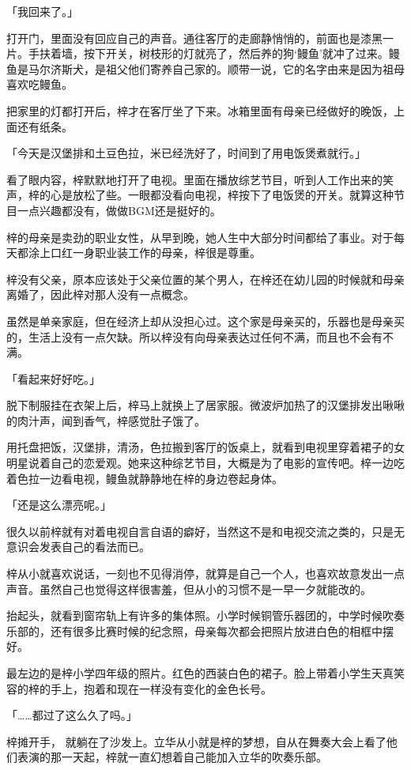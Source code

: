 \documentclass[UTF8]{ctexart}
\begin{document}
    「我回来了。」

    打开门，里面没有回应自己的声音。通往客厅的走廊静悄悄的，前面也是漆黑一片。手扶着墙，按下开关，树枝形的灯就亮了，然后养的狗‘鳗鱼’就冲了过来。鳗鱼是马尔济斯犬，是祖父他们寄养自己家的。顺带一说，它的名字由来是因为祖母喜欢吃鳗鱼。

    把家里的灯都打开后，梓才在客厅坐了下来。冰箱里面有母亲已经做好的晚饭，上面还有纸条。

    「今天是汉堡排和土豆色拉，米已经洗好了，时间到了用电饭煲煮就行。」

    看了眼内容，梓默默地打开了电视。里面在播放综艺节目，听到人工作出来的笑声，梓的心是放松了些。一眼都没看向电视，梓按下了电饭煲的开关。就算这种节目一点兴趣都没有，做做BGM还是挺好的。

    梓的母亲是卖劲的职业女性，从早到晚，她人生中大部分时间都给了事业。对于每天都涂上口红一身职业装工作的母亲，梓很是尊重。

    梓没有父亲，原本应该处于父亲位置的某个男人，在梓还在幼儿园的时候就和母亲离婚了，因此梓对那人没有一点概念。

    虽然是单亲家庭，但在经济上却从没担心过。这个家是母亲买的，乐器也是母亲买的，生活上没有一点欠缺。所以梓没有向母亲表达过任何不满，而且也不会有不满。

    「看起来好好吃。」

    脱下制服挂在衣架上后，梓马上就换上了居家服。微波炉加热了的汉堡排发出啾啾的肉汁声，闻到香气，梓感觉肚子饿了。

    用托盘把饭，汉堡排，清汤，色拉搬到客厅的饭桌上，就看到电视里穿着裙子的女明星说着自己的恋爱观。她来这种综艺节目，大概是为了电影的宣传吧。梓一边吃着色拉一边看电视，鳗鱼就静静地在梓的身边卷起身体。

    「还是这么漂亮呢。」

    很久以前梓就有对着电视自言自语的癖好，当然这不是和电视交流之类的，只是无意识会发表自己的看法而已。

    梓从小就喜欢说话，一刻也不见得消停，就算是自己一个人，也喜欢故意发出一点声音。虽然自己也觉得这样很害羞，但从小的习惯不是一早一夕就能改的。

    抬起头，就看到窗帘轨上有许多的集体照。小学时候铜管乐器团的，中学时候吹奏乐部的，还有很多比赛时候的纪念照，母亲每次都会把照片放进白色的相框中摆好。

    最左边的是梓小学四年级的照片。红色的西装白色的裙子。脸上带着小学生天真笑容的梓的手上，抱着和现在一样没有变化的金色长号。

    「……都过了这么久了吗。」

    梓摊开手， 就躺在了沙发上。立华从小就是梓的梦想，自从在舞奏大会上看了他们表演的那一天起，梓就一直幻想着自己能加入立华的吹奏乐部。
\end{document}
